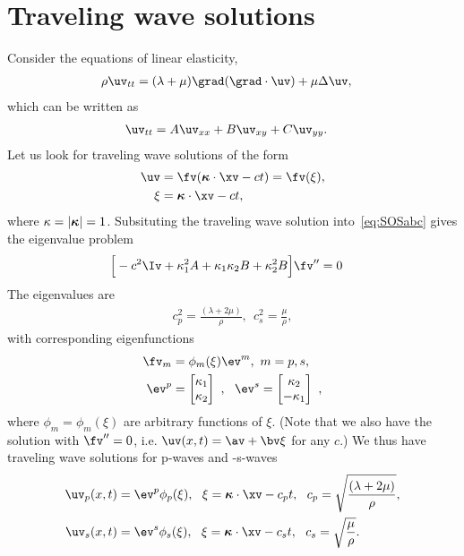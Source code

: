 \newcommand{\travelingDir}{\homeHenshaw/cgDoc/sm}
% 
\section{Traveling wave solutions}
\newcommand{\kappavhat}{\hat{\kappav}}

Consider the equations of linear elasticity, 
\begin{align*}
  \rho \uv_{tt} &= (\lambda+\mu) \grad(\grad\cdot\uv) + \mu \Delta \uv,
\end{align*}
which can be written as 
\begin{align}
   \uv_{tt}  &= A \uv_{xx} + B \uv_{xy} + C \uv_{yy} .  \label{eq:SOSabc}
\end{align}
Let us look for traveling wave solutions of the form
\begin{align*}
  \uv &= \fv( \kappav\cdot\xv - c t ) = \fv(\xi), \\
  \xi &= \kappav\cdot\xv - c t ,
\end{align*}
where $\kappa=\vert\boldsymbol{\kappa}\vert=1$.
Subsituting the traveling wave solution into~\eqref{eq:SOSabc} gives the eigenvalue
problem
\begin{align*}
  \Big[ -c^2 \Iv + \kappa_1^2 A + \kappa_1\kappa_2 B + \kappa_2^2 B \Big]\fv'' &=0 
\end{align*}
The eigenvalues are
\begin{align*}
  c_p^2 = \frac{(\lambda+2\mu)}{\rho}, ~~c_s^2 = \frac{\mu}{\rho},
\end{align*}
with corresponding eigenfunctions 
\begin{align*}
  \fv_m &= \phi_m(\xi) \ev^m, ~ m=p,s, \\
  \ev^p &= \begin{bmatrix}  \kappa_1 \\ \kappa_2 \end{bmatrix} ~,~~
  \ev^s = \begin{bmatrix}  \kappa_2 \\ -\kappa_1 \end{bmatrix} ~,
\end{align*}
where $\phi_m=\phi_m(\xi)$ are arbitrary functions of $\xi$.
(Note that we also have the solution with $\fv''=0$, i.e. $\uv(x,t) = \av + \bv\xi$ for any $c$.)
We thus have traveling wave solutions for p-waves and -s-waves
\begin{align*}
   \uv_p(x,t) &= \ev^p \phi_p(\xi), ~~\xi=\kappav\cdot\xv - c_p t, ~~
   c_p = \sqrt{\frac{(\lambda+2\mu)}{\rho}},  \\
   \uv_s(x,t) &= \ev^s \phi_s(\xi), ~~\xi=\kappav\cdot\xv - c_s t, ~~
   c_s = \sqrt{\frac{\mu}{\rho}}.
\end{align*}
